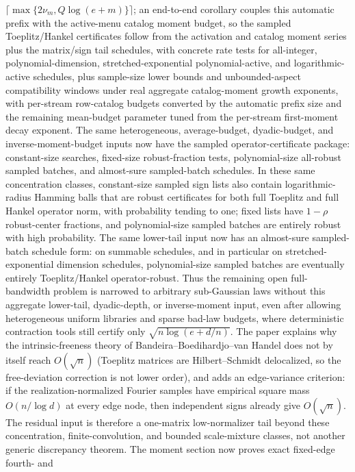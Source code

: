 \documentclass[11pt]{article}
\begin{document}
\(\lceil\max\{2\nu_m,Q\log(e+m)\}\rceil\); an end-to-end
corollary couples this automatic prefix with the active-menu catalog moment
budget, so the sampled Toeplitz/Hankel certificates follow from the activation
and catalog moment series plus the matrix/sign tail schedules, with concrete
rate tests for all-integer, polynomial-dimension, stretched-exponential
polynomial-active, and logarithmic-active schedules, plus sample-size lower
bounds and unbounded-aspect compatibility windows under real aggregate
catalog-moment growth exponents, with per-stream row-catalog budgets converted
by the automatic prefix size and the remaining mean-budget parameter tuned from
the per-stream first-moment decay exponent.
The same
heterogeneous,
average-budget, dyadic-budget, and inverse-moment-budget inputs now have the
sampled operator-certificate package:
constant-size searches, fixed-size robust-fraction tests, polynomial-size
all-robust sampled batches, and almost-sure sampled-batch schedules. In these
same concentration classes,
constant-size sampled sign lists also contain
logarithmic-radius Hamming balls that are robust certificates for both full
Toeplitz and full Hankel operator norm, with probability tending to one; fixed
lists have \(1-\rho\) robust-center fractions, and polynomial-size sampled
batches are entirely robust with high probability. The same lower-tail input now
has an almost-sure sampled-batch schedule form: on summable schedules,
and in particular on stretched-exponential dimension schedules, polynomial-size
sampled batches are eventually entirely Toeplitz/Hankel operator-robust. Thus the
remaining open full-bandwidth problem is narrowed to arbitrary sub-Gaussian laws
without this aggregate lower-tail, dyadic-depth, or inverse-moment input, even
after allowing heterogeneous uniform libraries and sparse bad-law budgets, where
deterministic contraction tools still certify only
\(\sqrt{n\log(e+d/n)}\).  The paper
explains why the intrinsic-freeness theory of
Bandeira--Boedihardjo--van Handel does not by itself reach $O(\sqrt n)$
(Toeplitz matrices are Hilbert--Schmidt delocalized, so the free-deviation
correction is not lower order), and adds an edge-variance criterion: if the
realization-normalized Fourier samples have empirical square mass
\(O(n/\log d)\) at every edge node, then independent signs already give
\(O(\sqrt n)\).  The residual input is therefore a one-matrix low-normalizer
tail beyond these concentration, finite-convolution, and bounded scale-mixture
classes, not another generic discrepancy
theorem.  The moment section now proves exact fixed-edge fourth- and
\end{document}
